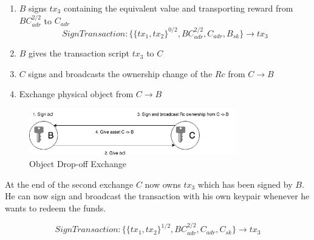 \begin{enumerate}
  \item $B$ signs $tx_3$ containing the equivalent value and transporting reward from $BC_{adr}^{2/2}$ to $C_{adr}$
  \[SignTransaction \colon \{\{tx_1, tx_2\}^{0/2}, BC_{adr}^{2/2}, C_{adr}, B_{sk}\} \rightarrow tx_3\]
  \item $B$ gives the transaction script $tx_3$ to $C$
  \item $C$ signs and broadcasts the ownership change of the $Rc$ from $C\rightarrow B$
  \item Exchange physical object from $C\rightarrow B$
\end{enumerate}

\begin{figure}[h]
\centering
\includegraphics[width=0.8\textwidth]{images/exchange_02.png}
\caption{Object Drop-off Exchange}
\label{fig:3 drop-off exchange}
\end{figure}

At the end of the second exchange $C$ now owns $tx_3$ which has been signed by $B$. He can now sign and broadcast the transaction with his own keypair whenever he wants to redeem the funds.

\[SignTransaction \colon \{\{tx_1, tx_2\}^{1/2}, BC_{adr}^{2/2}, C_{adr}, C_{sk}\} \rightarrow tx_3\]
